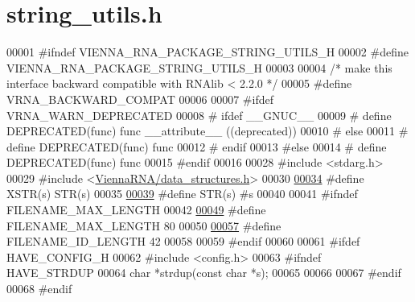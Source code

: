 \hypertarget{string__utils_8h_source}{}\section{string\+\_\+utils.\+h}
\label{string__utils_8h_source}

\begin{DoxyCode}
00001 \textcolor{preprocessor}{#ifndef VIENNA\_RNA\_PACKAGE\_STRING\_UTILS\_H}
00002 \textcolor{preprocessor}{#define VIENNA\_RNA\_PACKAGE\_STRING\_UTILS\_H}
00003 
00004 \textcolor{comment}{/* make this interface backward compatible with RNAlib < 2.2.0 */}
00005 \textcolor{preprocessor}{#define VRNA\_BACKWARD\_COMPAT}
00006 
00007 \textcolor{preprocessor}{#ifdef VRNA\_WARN\_DEPRECATED}
00008 \textcolor{preprocessor}{# ifdef \_\_GNUC\_\_}
00009 \textcolor{preprocessor}{#  define DEPRECATED(func) func \_\_attribute\_\_ ((deprecated))}
00010 \textcolor{preprocessor}{# else}
00011 \textcolor{preprocessor}{#  define DEPRECATED(func) func}
00012 \textcolor{preprocessor}{# endif}
00013 \textcolor{preprocessor}{#else}
00014 \textcolor{preprocessor}{# define DEPRECATED(func) func}
00015 \textcolor{preprocessor}{#endif}
00016 
00028 \textcolor{preprocessor}{#include <stdarg.h>}
00029 \textcolor{preprocessor}{#include <\hyperlink{data__structures_8h}{ViennaRNA/data\_structures.h}>}
00030 
\hyperlink{group__string__utils_ga03943706e48069237cd57f2d35ca987e}{00034} \textcolor{preprocessor}{#define XSTR(s) STR(s)}
00035 
\hyperlink{group__string__utils_ga6388870e639eee9c0a69446876f1f8cc}{00039} \textcolor{preprocessor}{#define STR(s) #s}
00040 
00041 \textcolor{preprocessor}{#ifndef FILENAME\_MAX\_LENGTH}
00042 
\hyperlink{group__string__utils_gafb228174279df9486a5cb56ac0bc79a3}{00049} \textcolor{preprocessor}{#define FILENAME\_MAX\_LENGTH   80}
00050 
\hyperlink{group__string__utils_ga33c3b1826b8e2739f09f111ec719ded5}{00057} \textcolor{preprocessor}{#define FILENAME\_ID\_LENGTH    42}
00058 
00059 \textcolor{preprocessor}{#endif}
00060 
00061 \textcolor{preprocessor}{#ifdef HAVE\_CONFIG\_H}
00062 \textcolor{preprocessor}{#include <config.h>}
00063 \textcolor{preprocessor}{#ifndef HAVE\_STRDUP}
00064 \textcolor{keywordtype}{char} *strdup(\textcolor{keyword}{const} \textcolor{keywordtype}{char} *s);
00065 
00066 
00067 \textcolor{preprocessor}{#endif}
00068 \textcolor{preprocessor}{#endif}

\end{DoxyCode}
